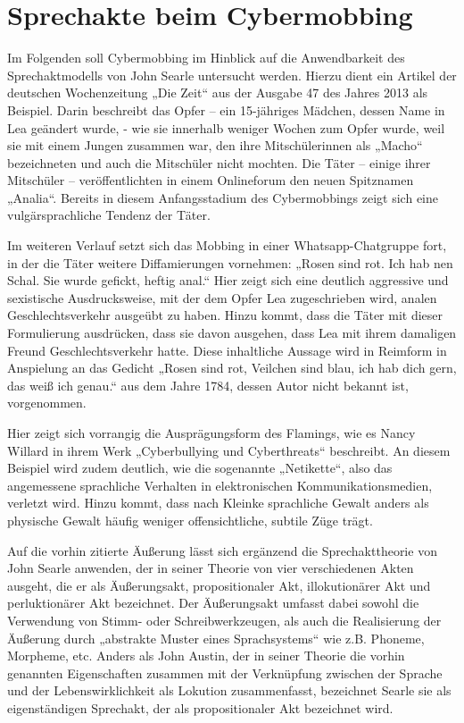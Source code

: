 \section{Sprechakte beim Cybermobbing}
Im Folgenden soll Cybermobbing im Hinblick auf die Anwendbarkeit des Sprechaktmodells von John Searle untersucht werden.
Hierzu dient ein Artikel der deutschen Wochenzeitung „Die Zeit“ aus der Ausgabe 47 des Jahres 2013 als Beispiel.
Darin beschreibt das Opfer – ein 15-jähriges Mädchen, dessen Name in Lea geändert wurde, - wie sie innerhalb weniger Wochen zum Opfer wurde, weil sie mit einem Jungen zusammen war, den ihre Mitschülerinnen als „Macho“ bezeichneten und auch die Mitschüler nicht mochten. \cite{LT13}
Die Täter – einige ihrer Mitschüler – veröffentlichten in einem Onlineforum den neuen Spitznamen „Analia“.
Bereits in diesem Anfangsstadium des Cybermobbings zeigt sich eine vulgärsprachliche Tendenz der Täter.

Im weiteren Verlauf setzt sich das Mobbing in einer Whatsapp-Chatgruppe fort, in der die Täter weitere Diffamierungen vornehmen: „Rosen sind rot. Ich hab nen Schal. Sie wurde gefickt, heftig anal.“ \cite[S.\,2]{LT13}
Hier zeigt sich eine deutlich aggressive und sexistische Ausdrucksweise, mit der dem Opfer Lea zugeschrieben wird, analen Geschlechtsverkehr ausgeübt zu haben.
Hinzu kommt, dass die Täter mit dieser Formulierung ausdrücken, dass sie davon ausgehen, dass Lea mit ihrem damaligen Freund Geschlechtsverkehr hatte.
Diese inhaltliche Aussage wird in Reimform in Anspielung an das Gedicht „Rosen sind rot, Veilchen sind blau, ich hab dich gern, das weiß ich genau.“ aus dem Jahre 1784, dessen Autor nicht bekannt ist, vorgenommen.

Hier zeigt sich vorrangig die Ausprägungsform des Flamings, wie es Nancy Willard in ihrem Werk „Cyberbullying und Cyberthreats“ beschreibt.
An diesem Beispiel wird zudem deutlich, wie die sogenannte „Netikette“, also das angemessene sprachliche Verhalten in elektronischen Kommunikationsmedien, verletzt wird.
Hinzu kommt, dass nach Kleinke sprachliche Gewalt anders als physische Gewalt häufig weniger offensichtliche, subtile Züge trägt. \cite[S.\,314]{SK07}

Auf die vorhin zitierte Äußerung lässt sich ergänzend die Sprechakttheorie von John Searle anwenden, der in seiner Theorie von vier verschiedenen Akten ausgeht, die er als Äußerungsakt, propositionaler Akt, illokutionärer Akt und perluktionärer Akt bezeichnet. \cite[S.\,210]{AL04}
Der Äußerungsakt umfasst dabei sowohl die Verwendung von Stimm- oder Schreibwerkzeugen, als auch die Realisierung der Äußerung durch „abstrakte Muster eines Sprachsystems“ wie z.B. Phoneme, Morpheme, etc. Anders als John Austin, der in seiner Theorie die vorhin genannten Eigenschaften zusammen mit der Verknüpfung zwischen der Sprache und der Lebenswirklichkeit als Lokution zusammenfasst, bezeichnet Searle sie als eigenständigen Sprechakt, der als propositionaler Akt bezeichnet wird.

